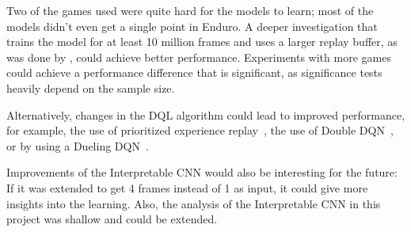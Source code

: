 Two of the games used were quite hard for the models to learn; most of the models didn't even get a single point in Enduro. A deeper investigation that trains the model for at least 10 million frames and uses a larger replay buffer, as was done by \textcite{mnih_playing_2013,mnih_human-level_2015}, could achieve better performance. Experiments with more games could achieve a performance difference that is significant, as significance tests heavily depend on the sample size.

Alternatively, changes in the DQL algorithm could lead to improved performance, for example, the use of prioritized experience replay~\parencite{schaul_prioritized_2016}, the use of Double DQN~\parencite{van_hasselt_deep_2015}, or by using a Dueling DQN~\parencite{wang_dueling_2016}.

Improvements of the Interpretable CNN would also be interesting for the future: If it was extended to get 4 frames instead of 1 as input, it could give more insights into the learning. Also, the analysis of the Interpretable CNN in this project was shallow and could be extended. 

